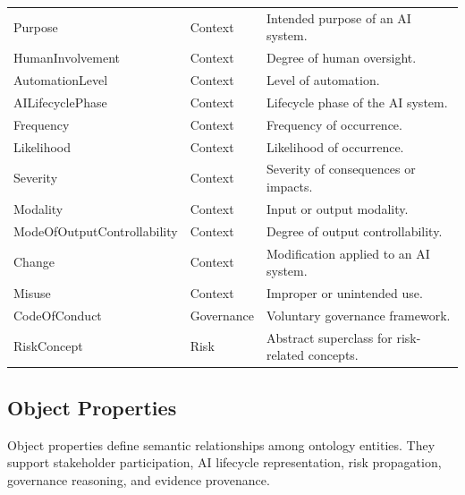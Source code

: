 \documentclass[a4paper,fleqn]{cas-dc}
\begin{document}
\begin{longtable}{>{\raggedright\arraybackslash}p{3.2cm}p{2.2cm}p{7.8cm}}
Purpose & Context &
Intended purpose of an AI system. \\

HumanInvolvement & Context &
Degree of human oversight. \\

AutomationLevel & Context &
Level of automation. \\

AILifecyclePhase & Context &
Lifecycle phase of the AI system. \\

Frequency & Context &
Frequency of occurrence. \\

Likelihood & Context &
Likelihood of occurrence. \\

Severity & Context &
Severity of consequences or impacts. \\

Modality & Context &
Input or output modality. \\

ModeOfOutput\allowbreak Controllability & Context &
Degree of output controllability. \\

Change & Context &
Modification applied to an AI system. \\

Misuse & Context &
Improper or unintended use. \\

CodeOfConduct & Governance &
Voluntary governance framework. \\

RiskConcept & Risk &
Abstract superclass for risk-related concepts. \\

\end{longtable}

\subsection{Object Properties}

Object properties define semantic relationships among ontology entities.
They support stakeholder participation, AI lifecycle representation, risk
propagation, governance reasoning, and evidence provenance.
\end{document}
